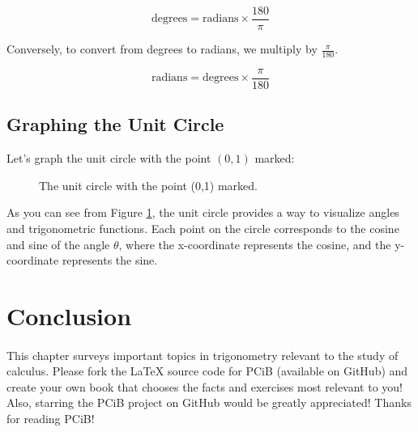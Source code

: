 \documentclass[a4paper,12pt]{book}
\begin{document}
\[
\text{degrees} = \text{radians} \times \frac{180}{\pi}
\]

Conversely, to convert from degrees to radians, we multiply by \(\frac{\pi}{180}\).

\[
\text{radians} = \text{degrees} \times \frac{\pi}{180}
\]

\subsection{Graphing the Unit Circle}
\label{subsec:graphing_unit_circle}

Let's graph the unit circle with the point \((0,1)\) marked:

\begin{figure}[ht!]
\centering
{}
\caption{The unit circle with the point (0,1) marked.}
\label{fig:unit_circle}
\end{figure}

As you can see from Figure \ref{fig:unit_circle}, the unit circle provides a way to visualize angles and trigonometric functions. Each point on the circle corresponds to the cosine and sine of the angle \(\theta\), where the x-coordinate represents the cosine, and the y-coordinate represents the sine.



\section*{Conclusion}
\paragraph{}
This chapter surveys important topics in trigonometry relevant to the study of calculus. Please fork the LaTeX source code for PCiB (available on GitHub) and create your own book that chooses the facts and exercises most relevant to you! Also, starring the PCiB project on GitHub would be greatly appreciated! Thanks for reading PCiB!
\end{document}
